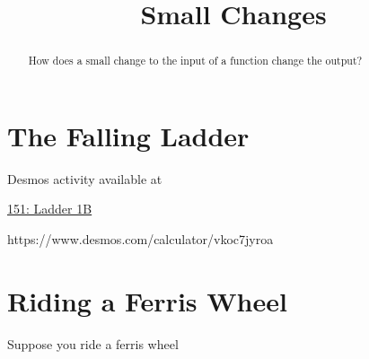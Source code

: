 \documentclass{ximera}
\title{Small Changes}
\begin{document}
\begin{abstract}
How does a small change to the input of a function change the output?
\end{abstract}
\maketitle


\section{The Falling Ladder}

 
\begin{onlineOnly}
    \begin{center}
\end{center}
\end{onlineOnly}

Desmos activity available at

\href{https://www.desmos.com/calculator/vkoc7jyroa}{151: Ladder 1B}


https://www.desmos.com/calculator/vkoc7jyroa



\section{Riding a Ferris Wheel}


Suppose  you ride a ferris wheel
\end{document}
